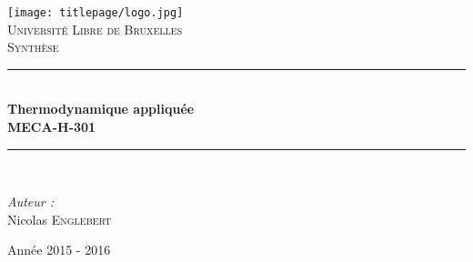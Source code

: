 \AddToShipoutPicture*{\BackgroundPic}
\begin{titlepage}
\begin{center}	
	
	\newcommand{\HRule}{\rule{\linewidth}{0.5mm}}   			            %
	\texttt{[image: titlepage/logo.jpg]}~\\[1cm]				%

	\textsc{\LARGE Université Libre de Bruxelles}\\[1.5cm]
	\textsc{\Large Synthèse}\\[0.5cm]

	\HRule \\[0.4cm]
	{ \huge \bfseries Thermodynamique appliquée \ \\MECA-H-301 \\[0.4cm] }


	\HRule \\[1.5cm]
		\begin{minipage}{0.4\textwidth}
		\begin{flushleft} \large
		
		\emph{Auteur :}\\
			Nicolas \textsc{Englebert}

			\end{flushleft}
			\end{minipage}
			\begin{minipage}{0.4\textwidth}
			\begin{flushright} \large
			\end{flushright}
		\end{minipage}

	\vfill

{\large Année 2015 - 2016}

\end{center}
\end{titlepage}

